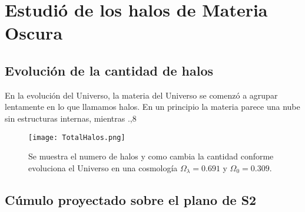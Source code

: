 
\chapter{Estudió de los halos de Materia Oscura}
\setcounter{equation}{0}



\section{Evolución de la cantidad de halos}

En la evolución del Universo, la materia del Universo se comenzó a agrupar lentamente en lo que llamamos halos. En un principio la materia parece una nube sin estructuras internas, mientras .,8
\begin{figure}[H]
    \centering
    \texttt{[image: TotalHalos.png]}
    \label{fig:EvoNumTotHalos}
    \caption[Evolución del Número de halos]{Se muestra el numero de halos y como cambia la cantidad conforme evoluciona el Universo en una cosmología $\Omega_\lambda = 0.691 $ y $\Omega_0 = 0.309$.}
\end{figure}


\section{Cúmulo proyectado sobre el plano de S2}


